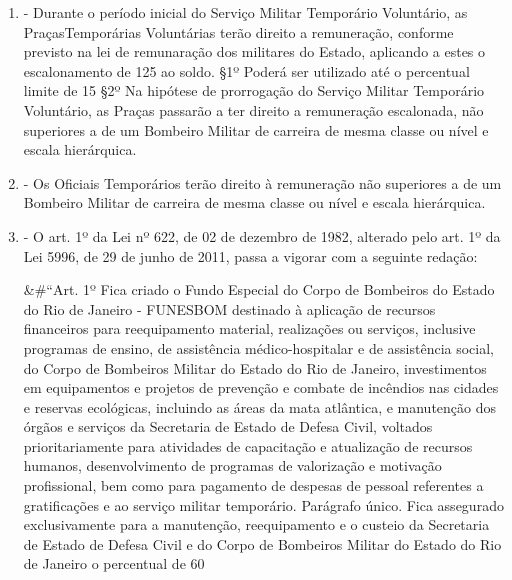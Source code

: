 \documentclass[10pt]{article}
\begin{document}
\begin{enumerate}[label=Art. \arabic*\textdegree]
\item - Durante o período inicial do Serviço Militar Temporário Voluntário, as PraçasTemporárias Voluntárias terão direito a remuneração, conforme previsto na lei de remunaração dos militares do Estado, aplicando a estes o escalonamento de 125 ao soldo.
§1º Poderá ser utilizado até o percentual limite de 15%
§2º Na hipótese de prorrogação do Serviço Militar Temporário Voluntário, as Praças passarão a ter direito a remuneração escalonada, não superiores a de um Bombeiro Militar de carreira de mesma classe ou nível e escala hierárquica.
\item - Os Oficiais Temporários terão direito à remuneração não superiores a de um Bombeiro Militar de carreira de mesma classe ou nível e escala hierárquica.
\item - O art. 1º da Lei nº 622, de 02 de dezembro de 1982, alterado pelo art. 1º da Lei 5996, de 29 de junho de 2011, passa a vigorar com a seguinte redação:



&#``Art. 1º Fica criado o Fundo Especial do Corpo de Bombeiros do Estado do Rio de Janeiro - FUNESBOM destinado à aplicação de recursos financeiros para reequipamento material, realizações ou serviços, inclusive programas de ensino, de assistência médico-hospitalar e de assistência social, do Corpo de Bombeiros Militar do Estado do Rio de Janeiro, investimentos em equipamentos e projetos de prevenção e combate de incêndios nas cidades e reservas ecológicas, incluindo as áreas da mata atlântica, e manutenção dos órgãos e serviços da Secretaria de Estado de Defesa Civil, voltados prioritariamente para atividades de capacitação e atualização de recursos humanos, desenvolvimento de programas de valorização e motivação profissional, bem como para pagamento de despesas de pessoal referentes a gratificações e ao serviço militar temporário.
Parágrafo único. Fica assegurado exclusivamente para a manutenção, reequipamento e o custeio da Secretaria de Estado de Defesa Civil e do Corpo de Bombeiros Militar do Estado do Rio de Janeiro o percentual de 60%




\end{enumerate}
\end{document}
